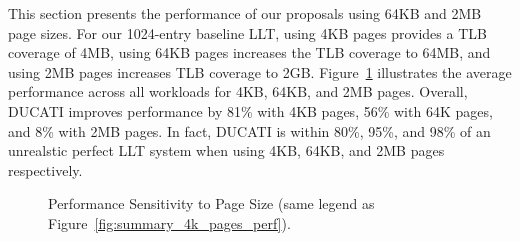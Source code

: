 \noindent This section presents the performance of our proposals using 64KB
and 2MB page sizes. For our 1024-entry baseline LLT, using 4KB
pages provides a TLB coverage of 4MB, using 64KB pages increases the TLB
coverage to 64MB, and using 2MB pages increases TLB coverage to
2GB. Figure~\ref{fig:summary_pagesize} illustrates the average
performance across all workloads for 4KB, 64KB, and 2MB pages.
Overall, DUCATI improves performance by 81\% with 4KB pages, 56\% with
64K pages, and 8\% with 2MB pages. In fact, DUCATI is within 80\%,
95\%, and 98\% of an unrealstic perfect LLT system when using 4KB,
64KB, and 2MB pages respectively.
\begin{figure}[tp] 
\vspace{0. in} \centering
\centerline{}

\caption{\small Performance Sensitivity to Page Size (same legend as
Figure~\ref{fig:summary_4k_pages_perf}). \normalsize}

\label{fig:summary_pagesize} 
\vspace{-0. in}
\end{figure}

% 
% 
